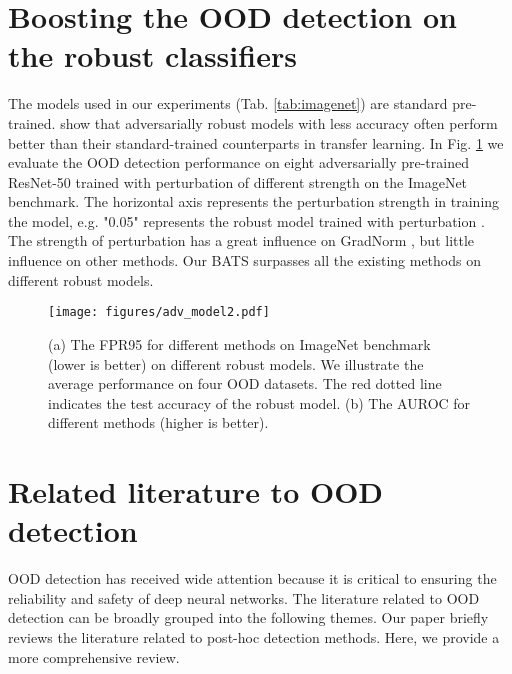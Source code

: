 \documentclass{article}
\begin{document}
\section{Boosting the OOD detection on the robust classifiers}\label{App:Robust}
 The models used in our experiments (Tab. \ref{tab:imagenet}) are standard pre-trained. \citet{salman2020adversariallytrans} show that adversarially robust models with less accuracy often perform better than their standard-trained counterparts in transfer learning.
 In Fig. \ref{img:advmodel} we evaluate the OOD detection performance on eight adversarially pre-trained ResNet-50 trained with  perturbation of different strength  \cite{salman2020adversariallytrans} on the ImageNet benchmark. The horizontal axis represents the perturbation strength in training the model, e.g. "0.05" represents the robust model trained with  perturbation . The strength of perturbation has a great influence on GradNorm \cite{huang2021importance}, but little influence on other methods. Our BATS surpasses all the existing methods on different robust models.
 
 \begin{figure}[htbp]
\centering
\texttt{[image: figures/adv\_model2.pdf]}
\caption{(a) The FPR95 for different methods on ImageNet benchmark (lower is better) on different robust models. We illustrate the average performance on four OOD datasets. The red dotted line indicates the test accuracy of the robust model. (b) The AUROC for different methods (higher is better).}
\label{img:advmodel}
\end{figure}


\section{Related literature to OOD detection}\label{App:related}
OOD detection has received wide attention because it is critical to ensuring the reliability and safety of deep neural networks.
The literature related to OOD detection can be broadly grouped into the following themes. Our paper briefly reviews the literature related to post-hoc detection methods. Here, we provide a more comprehensive review. 
\end{document}
